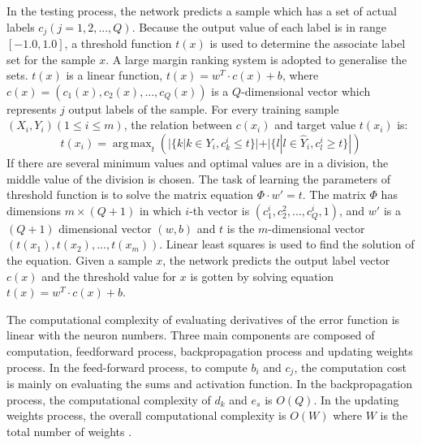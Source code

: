 In the testing process, the network predicts a sample which has a set of actual labels $c_{j} (j = 1,2,...,Q)$. Because the output value of each label is in range $[-1.0,1.0]$, a threshold function $t(x)$ is used to determine the associate label set for the sample $x$. A large margin ranking system \citep{elisseeff2001kernel} is adopted to generalise the sets. $t(x)$ is a linear function, $t(x) = w^T\cdot c(x) + b$, where $c(x) = (c_{1}(x), c_{2}(x),...,c_{Q}(x))$ is a $Q$-dimensional vector which represents $j$ output labels of the sample. For every training sample $(X_{i}, Y_{i}) (1 \leq i \leq m)$, the relation between $c(x_{i})$ and target value $t(x_{i})$ is:
\begin{equation}\label{eq:MultiLableThreshFunc}
t(x_{i}) =  \operatorname{arg\,max}_t (|\{k|k \in Y_{i}, c_{k}^i \leq t\}| + |\{l|l \in \hat{Y}_{i}, c_{l}^i \geq t\}|) 
\end{equation}
If there are several minimum values and optimal values are in a division, the middle value of the division is chosen. The task of learning the parameters of threshold function is to solve the matrix equation $\Phi \cdot w' = t$. The matrix $\Phi$ has dimensions $m \times (Q + 1)$ in which $i$-th vector is $(c_{1}^i, c_{2}^2,...,c_{Q}^i,1)$, and $w'$ is a $(Q+1)$ dimensional vector $(w,b)$ and $t$ is the $m$-dimensional vector $(t(x_{1}), t(x_{2}),...,t(x_{m}))$. Linear least squares is used to find the solution of the equation. Given a sample $x$, the network predicts the output label vector $c(x)$ and the threshold value for $x$ is gotten by solving equation $t(x) = w^T \cdot c(x) + b$.

The computational complexity of evaluating derivatives of the error function is linear with the neuron numbers. Three main components are composed of computation, feedforward process, backpropagation process and updating weights process. In the feed-forward process, to compute $b_{i}$ and $c_{j}$, the computation cost is mainly on evaluating the sums and activation function. In the backpropagation process, the computational complexity of $d_{k}$ and $e_{s}$ is $O(Q)$. In the updating weights process, the overall computational complexity is $O(W)$ where $W$ is the total number of weights . 





















